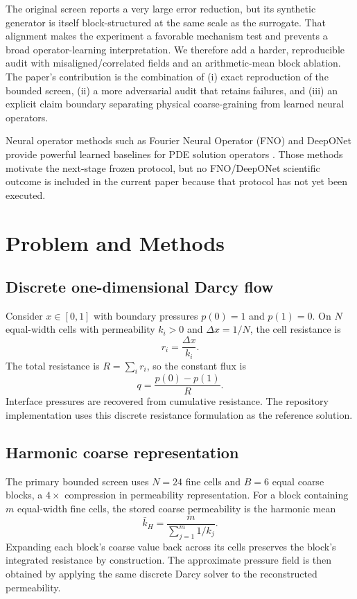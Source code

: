 \documentclass[10pt]{article}
\begin{document}
The original screen reports a very large error reduction, but its synthetic generator is itself block-structured at the same scale as the surrogate. That alignment makes the experiment a favorable mechanism test and prevents a broad operator-learning interpretation. We therefore add a harder, reproducible audit with misaligned/correlated fields and an arithmetic-mean block ablation. The paper's contribution is the combination of (i) exact reproduction of the bounded screen, (ii) a more adversarial audit that retains failures, and (iii) an explicit claim boundary separating physical coarse-graining from learned neural operators.

Neural operator methods such as Fourier Neural Operator (FNO) and DeepONet provide powerful learned baselines for PDE solution operators \cite{li2021fno,lu2021deeponet}. Those methods motivate the next-stage frozen protocol, but no FNO/DeepONet scientific outcome is included in the current paper because that protocol has not yet been executed.

\section{Problem and Methods}
\subsection{Discrete one-dimensional Darcy flow}
Consider $x\in[0,1]$ with boundary pressures $p(0)=1$ and $p(1)=0$. On $N$ equal-width cells with permeability $k_i>0$ and $\Delta x=1/N$, the cell resistance is
\begin{equation}
r_i = \frac{\Delta x}{k_i}.
\end{equation}
The total resistance is $R=\sum_i r_i$, so the constant flux is
\begin{equation}
q = \frac{p(0)-p(1)}{R}.
\end{equation}
Interface pressures are recovered from cumulative resistance. The repository implementation uses this discrete resistance formulation as the reference solution.

\subsection{Harmonic coarse representation}
The primary bounded screen uses $N=24$ fine cells and $B=6$ equal coarse blocks, a $4\times$ compression in permeability representation. For a block containing $m$ equal-width fine cells, the stored coarse permeability is the harmonic mean
\begin{equation}
\bar{k}_H = \frac{m}{\sum_{j=1}^{m} 1/k_j}.
\end{equation}
Expanding each block's coarse value back across its cells preserves the block's integrated resistance by construction. The approximate pressure field is then obtained by applying the same discrete Darcy solver to the reconstructed permeability.
\end{document}
